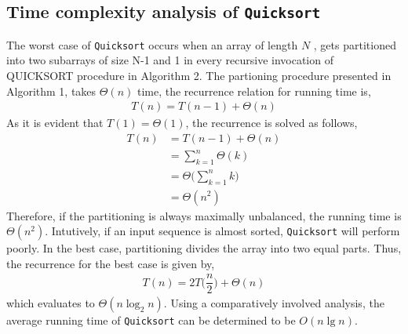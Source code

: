 \documentclass[a4paper, 10pt,twocolumn]{article}
\begin{document}
\subsection{Time complexity analysis of \texttt{Quicksort}}
The worst case of \texttt{Quicksort} occurs when an array of length $N$ , gets partitioned into two subarrays of size N-1 and 1 in every recursive invocation of QUICKSORT procedure in Algorithm 2. The partioning procedure presented in Algorithm 1, takes $\Theta(n)$ time, the recurrence relation for running time is,
\begin{align*}
T(n) = T(n-1) + \Theta(n)
\end{align*}
As it is  evident that $T(1) = \Theta(1)$, the recurrence is solved as follows,
\begin{align*}
T(n) &= T(n-1) + \Theta(n) \\
&= \sum_{k=1}^{n} \Theta(k) \\
&= \Theta\Bigg( \sum_{k=1}^{n} k\Bigg) \\
&= \Theta(n^2)
\end{align*}
Therefore, if the partitioning is always maximally unbalanced,
the running time is $\Theta(n^2)$. Intutively, if an input sequence is almost sorted, \texttt{Quicksort} will perform poorly. In the best case, partitioning divides the array into two equal parts. Thus, the recurrence for the best case is given by,
\begin{align*}
T(n) = 2T\bigg(\dfrac{n}{2}\bigg) + \Theta(n)
\end{align*}
which evaluates to $\Theta(n\log_{2}n)$. Using a comparatively involved analysis, the average running time of \texttt{Quicksort} can be determined to be $O(n\lg n)$.
\end{document}
